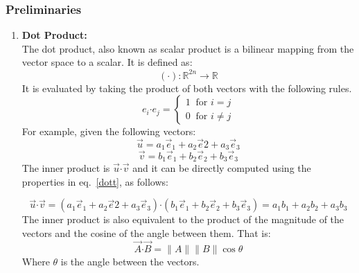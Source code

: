 \documentclass[12pt,onecolumn,letterpaper]{article} %
\begin{document}
\subsubsection{Preliminaries}
\begin{enumerate}
    \item \textbf{Dot Product:}\\
    The dot product, also known as scalar product is a bilinear mapping from the vector space to a scalar. It is defined as:
    $$(\boldsymbol{\cdot}):\mathbb{R}^{2n} \rightarrow \mathbb{R}$$
     It is evaluated by taking the product of both vectors with the following rules.
      \begin{equation}
      e_i\boldsymbol{\cdot}e_j= \begin{cases} 
      1\ {\mbox{ for }} i= j \\
      0\ {\mbox{ for }} i \neq j
   \end{cases}\label{dott}
   \end{equation}
   For example, given the following vectors:
    $$\vec{u} =a_1\vec{e}_1+a_2\vec{e}2+a_3\vec{e}_3$$
    $$\vec{v}=b_1\vec{e}_1+b_2\vec{e}_2+b_3\vec{e}_3$$
     The inner product is $\vec{u} \boldsymbol{\cdot} \vec{v}$ and it can be directly computed using the properties in eq.~\ref{dott}, as follows:
   
 $$\vec{u} \boldsymbol{\cdot} \vec{v}=(a_1\vec{e}_1+a_2\vec{e}2+a_3\vec{e}_3) \boldsymbol{\cdot} (b_1\vec{e}_1+b_2\vec{e}_2+b_3\vec{e}_3)=a_1b_1+a_2b_2+a_3b_3$$
   The inner product is also equivalent to the product of the magnitude of the vectors and the cosine of the angle between them.
   That is:
   \begin{equation}\vec{A} \boldsymbol{\cdot} \vec{B}=\|A\|\|B\|\cos\theta\end{equation}
   Where $\theta$ is the angle between the vectors.\\


\end{enumerate}
\end{document}
